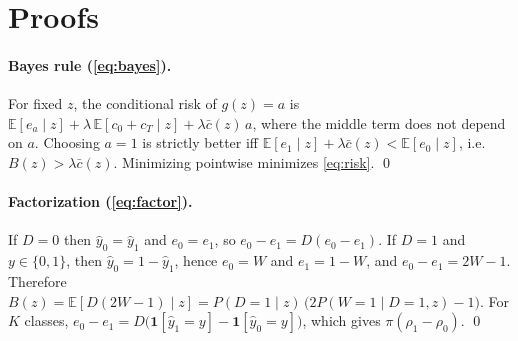 \begin{table}[t]
\centering\footnotesize\setlength{\tabcolsep}{3pt}
\resizebox{\textwidth}{!}{}
\caption{Routing behaviour (mE5, $\lambda=0$): selection rate, harmful transformations per 100 inputs, share of oracle opportunities captured, and estimated cost relative to B0 (\cref{app:repro}). Help/harm: number of inputs where normalization corrects/introduces an error.}
\label{tab:routing}
\vspace{2mm}
\centering\scriptsize\setlength{\tabcolsep}{4pt}

\caption{95\% intervals for the mechanism measurements of \cref{tab:mechanism} (1{,}000 bootstrap resamples of test sentences, seed-averaged within each resample; estimators not refitted).}
\label{tab:mechanism-ci}
\vspace{2mm}
\centering\scriptsize\setlength{\tabcolsep}{3pt}

\caption{Sensitivity of the oracle reference (range over the four sets). ``Views headroom'': oracle over $x$ and $T(x)$ minus the best view; other columns: the same for two classifiers differing only in their training sample (bootstrap as in \cref{tab:mechanism}, 80\%/50\% subsamples, or bootstrap with $C\times3$ or $C/3$), applied to $x$; mean of 10 pairs.}
\label{tab:noise}
\end{table}
\section{Proofs}
\label{app:proofs}

\paragraph{Bayes rule (\cref{eq:bayes}).}
For fixed $z$, the conditional risk of $g(z)=a$ is $\mathbb E[e_a\mid z]+\lambda\,\mathbb E[c_0+c_T\mid z]+\lambda\bar c(z)\,a$, where the middle term does not depend on $a$. Choosing $a=1$ is strictly better iff $\mathbb E[e_1\mid z]+\lambda\bar c(z)<\mathbb E[e_0\mid z]$, i.e.\ $B(z)>\lambda\bar c(z)$. Minimizing pointwise minimizes \cref{eq:risk}. \qed

\paragraph{Factorization (\cref{eq:factor}).}
If $D=0$ then $\hat y_0=\hat y_1$ and $e_0=e_1$, so $e_0-e_1=D(e_0-e_1)$. If $D=1$ and $y\in\{0,1\}$, then $\hat y_0=1-\hat y_1$, hence $e_0=W$ and $e_1=1-W$, and $e_0-e_1=2W-1$. Therefore $B(z)=\mathbb E[D(2W-1)\mid z]=P(D{=}1\mid z)\,\big(2P(W{=}1\mid D{=}1,z)-1\big)$. For $K$ classes, $e_0-e_1=D\big(\mathbf 1[\hat y_1{=}y]-\mathbf 1[\hat y_0{=}y]\big)$, which gives $\pi(\rho_1-\rho_0)$. \qed

